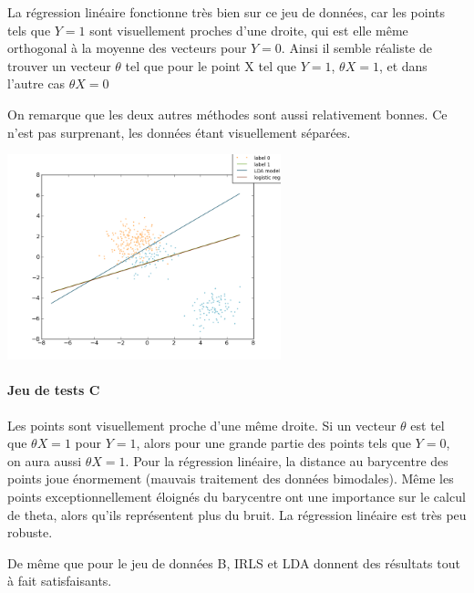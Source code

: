 \documentclass{article}
\begin{document}
La régression linéaire fonctionne très bien sur ce jeu de données, car les
points tels que $Y = 1$ sont visuellement proches d'une droite, qui est elle
même orthogonal à la moyenne des vecteurs pour $Y = 0$. Ainsi il semble
réaliste de trouver un vecteur $\theta$ tel que pour le point X tel que $Y = 1$,
$\theta X = 1$, et dans l'autre cas $\theta X = 0$

On remarque que les deux autres méthodes sont aussi relativement bonnes. Ce
n'est pas surprenant, les données étant visuellement séparées.

\includegraphics[width=300px]{classificationC1.png}


\paragraph{Jeu de tests C}

Les points sont visuellement proche d'une même droite. Si un vecteur $\theta$
est tel que $\theta X = 1$ pour $Y = 1$, alors pour une grande partie des
points tels que $Y = 0$, on aura aussi $\theta X = 1$. Pour la régression
linéaire, la distance au barycentre des points joue énormement (mauvais
traitement des données bimodales). Même les points exceptionnellement éloignés
du barycentre ont une importance sur le calcul de theta, alors qu'ils
représentent plus du bruit. La régression linéaire est très peu robuste.

De même que pour le jeu de données B, IRLS et LDA donnent des résultats tout à
fait satisfaisants.
\end{document}
